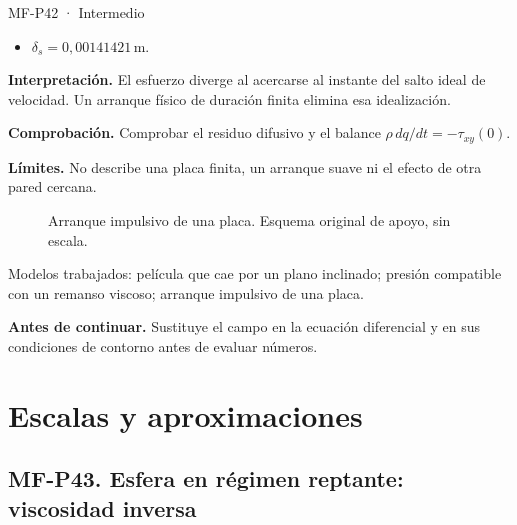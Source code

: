 \begin{studiumworked}{MF-P42 · Intermedio}
\begin{itemize}
\item $\delta_s=0{,}00141421\,\mathrm{m}$.

\end{itemize}

\textbf{Interpretación.} El esfuerzo diverge al acercarse al instante del salto ideal de velocidad. Un arranque físico de duración finita elimina esa idealización.

\textbf{Comprobación.} Comprobar el residuo difusivo y el balance $\rho\,dq/dt=-\tau_{xy}(0)$.

\textbf{Límites.} No describe una placa finita, un arranque suave ni el efecto de otra pared cercana.

\end{studiumworked}


\begin{figure}[htbp]\centering{}\caption{Arranque impulsivo de una placa. Esquema original de apoyo, sin escala.}\label{fig:mf-p42}\end{figure}


\begin{tcolorbox}[studiumcheck,breakable=false,title={Síntesis y comprobación}]Modelos trabajados: película que cae por un plano inclinado; presión compatible con un remanso viscoso; arranque impulsivo de una placa.\par\textbf{Antes de continuar.} Sustituye el campo en la ecuación diferencial y en sus condiciones de contorno antes de evaluar números.\end{tcolorbox}

\chapter{Escalas y aproximaciones}


\Needspace{.30\textheight}\section{MF-P43. Esfera en régimen reptante: viscosidad inversa}

